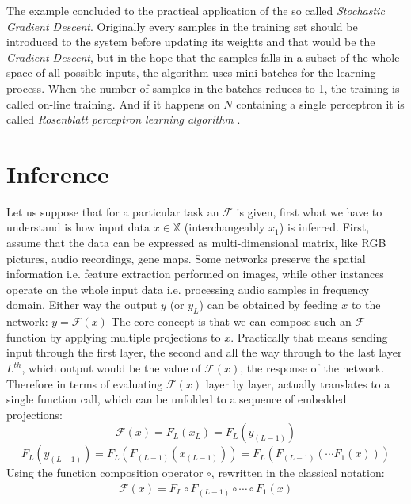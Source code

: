 The example concluded to the practical application of the so called \emph{Stochastic Gradient Descent}. Originally every samples in the training set should be introduced to the system before updating its weights and that would be the \emph{Gradient Descent}, but in  the hope that the samples falls in a subset of the whole space of all possible inputs, the algorithm uses mini-batches for the learning process. When the number of samples in the batches reduces to 1, the training is called on-line training. And if it happens on $N$ containing a single perceptron it is called \emph{Rosenblatt perceptron learning algorithm} .


\section{Inference}
Let us suppose that for a particular task an $\mathcal{F}$ is given, first what we have to understand is how input data 
$x \in \mathbb{X}$ (interchangeably $x_1$) is inferred.
First, assume that the data can be expressed as multi-dimensional matrix, like RGB pictures, audio recordings, gene maps.
Some networks preserve the spatial information i.e. feature extraction performed on images, 
while other instances operate on the whole input data i.e. processing audio samples in frequency domain.
Either way the output $y$ (or $y_L$) can be obtained by feeding $x$ to the network: 
$ y = \mathcal{F}(x)$
The core concept is that we can compose such an $\mathcal{F}$ function by applying multiple projections to $x$.
Practically that means sending input through the first layer, the second and all the way through to the last layer $L^{th}$, which output would be the value of $\mathcal{F}(x)$, the response of the network.
Therefore in terms of evaluating $\mathcal{F}(x)$ layer by layer, actually translates to a single function call, which can be unfolded to a sequence of embedded projections:
$$
    \mathcal{F}(x) = F_L \left( x_L \right) = F_L \left( y_{(L-1)} \right)
$$
$$
    F_L \left( y_{(L-1)} \right) = 
    F_L \left( F_{(L-1)} \left( x_{(L-1)} \right) \right) = F_L \left( F_{(L-1)}\left( \cdots F_1(x)\right)\right)
$$
Using the function composition operator $\circ$, rewritten in the classical notation:
\begin{equation}\label{eq:forward}
\begin{split}
    \mathcal{F}(x) = F_L \circ F_{(L-1)} \circ \cdots \circ F_1(x)
\end{split}
\end{equation}

